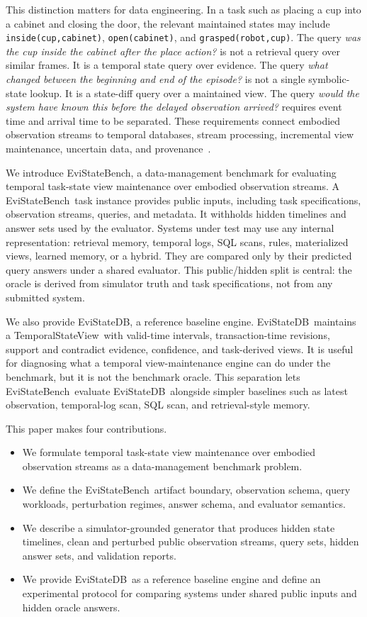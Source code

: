 \documentclass[conference]{IEEEtran}
\newcommand{\bench}{EviStateBench}
\newcommand{\engine}{EviStateDB}
\newcommand{\tsv}{TemporalStateView}
\begin{document}
This distinction matters for data engineering. In a task such as placing a cup into a cabinet and closing the door, the relevant maintained states may include \texttt{inside(cup,cabinet)}, \texttt{open(cabinet)}, and \texttt{grasped(robot,cup)}. The query \emph{was the cup inside the cabinet after the place action?} is not a retrieval query over similar frames. It is a temporal state query over evidence. The query \emph{what changed between the beginning and end of the episode?} is not a single symbolic-state lookup. It is a state-diff query over a maintained view. The query \emph{would the system have known this before the delayed observation arrived?} requires event time and arrival time to be separated. These requirements connect embodied observation streams to temporal databases, stream processing, incremental view maintenance, uncertain data, and provenance~\cite{snodgrass1999developing,jensen1999temporal,babcock2002models,gupta1995maintenance,zhuge1995view,aggarwal2009uncertain,green2007provenance,cheney2009provenance}.

We introduce \bench, a data-management benchmark for evaluating temporal task-state view maintenance over embodied observation streams. A \bench\ task instance provides public inputs, including task specifications, observation streams, queries, and metadata. It withholds hidden timelines and answer sets used by the evaluator. Systems under test may use any internal representation: retrieval memory, temporal logs, SQL scans, rules, materialized views, learned memory, or a hybrid. They are compared only by their predicted query answers under a shared evaluator. This public/hidden split is central: the oracle is derived from simulator truth and task specifications, not from any submitted system.

We also provide \engine, a reference baseline engine. \engine\ maintains a \tsv\ with valid-time intervals, transaction-time revisions, support and contradict evidence, confidence, and task-derived views. It is useful for diagnosing what a temporal view-maintenance engine can do under the benchmark, but it is not the benchmark oracle. This separation lets \bench\ evaluate \engine\ alongside simpler baselines such as latest observation, temporal-log scan, SQL scan, and retrieval-style memory.

This paper makes four contributions.
\begin{itemize}
    \item We formulate temporal task-state view maintenance over embodied observation streams as a data-management benchmark problem.
    \item We define the \bench\ artifact boundary, observation schema, query workloads, perturbation regimes, answer schema, and evaluator semantics.
    \item We describe a simulator-grounded generator that produces hidden state timelines, clean and perturbed public observation streams, query sets, hidden answer sets, and validation reports.
    \item We provide \engine\ as a reference baseline engine and define an experimental protocol for comparing systems under shared public inputs and hidden oracle answers.
\end{itemize}
\end{document}

